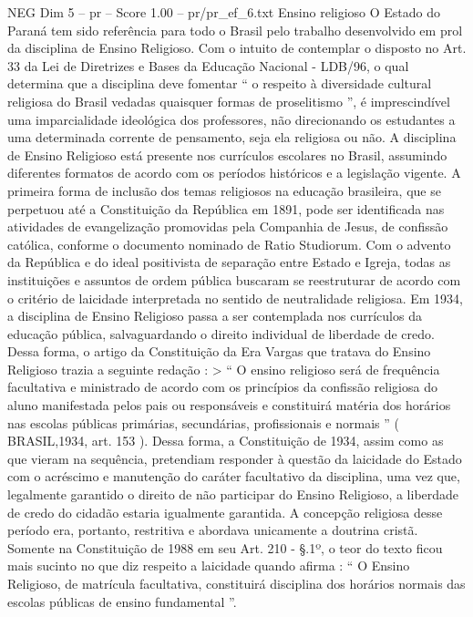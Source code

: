 \begin{textsample}{NEG Dim 5 – pr – Score 1.00 – pr/pr\_ef\_6.txt}  \label{ex:f5_neg_237}
Ensino religioso O Estado do Paraná tem sido referência para todo o Brasil pelo trabalho desenvolvido em prol da disciplina de Ensino Religioso.
Com o intuito de contemplar o disposto no Art. 33 da Lei de Diretrizes e Bases da Educação Nacional - LDB/96, o qual determina que a disciplina deve fomentar “ o respeito à diversidade cultural religiosa do Brasil vedadas quaisquer formas de proselitismo ”, é imprescindível uma imparcialidade ideológica dos professores, não direcionando os estudantes a uma determinada corrente de pensamento, seja ela religiosa ou não.
A disciplina de Ensino Religioso está presente nos currículos escolares no Brasil, assumindo diferentes formatos de acordo com os períodos históricos e a legislação vigente.
A primeira forma de inclusão dos temas religiosos na educação brasileira, que se perpetuou até a Constituição da República em 1891, pode ser identificada nas atividades de evangelização promovidas pela Companhia de Jesus, de confissão católica, conforme o documento nominado de Ratio Studiorum.
Com o advento da República e do ideal positivista de separação entre Estado e Igreja, todas as instituições e assuntos de ordem pública buscaram se reestruturar de acordo com o critério de laicidade interpretada no sentido de neutralidade religiosa.
Em 1934, a disciplina de Ensino Religioso passa a ser contemplada nos currículos da educação pública, salvaguardando o direito individual de liberdade de credo.
Dessa forma, o artigo da Constituição da Era Vargas que tratava do Ensino Religioso trazia a seguinte redação : > “ O ensino religioso será de frequência facultativa e ministrado de acordo com os princípios da confissão religiosa do aluno manifestada pelos pais ou responsáveis e constituirá matéria dos horários nas escolas públicas primárias, secundárias, profissionais e normais ” ( BRASIL,1934, art. 153 ).
Dessa forma, a Constituição de 1934, assim como as que vieram na sequência, pretendiam responder à questão da laicidade do Estado com o acréscimo e manutenção do caráter facultativo da disciplina, uma vez que, legalmente garantido o direito de não participar do Ensino Religioso, a liberdade de credo do cidadão estaria igualmente garantida.
A concepção religiosa desse período era, portanto, restritiva e abordava unicamente a doutrina cristã.
Somente na Constituição de 1988 em seu Art. 210 - §.1º, o teor do texto ficou mais sucinto no que diz respeito a laicidade quando afirma : “ O Ensino Religioso, de matrícula facultativa, constituirá disciplina dos horários normais das escolas públicas de ensino fundamental ”.

\end{textsample}
